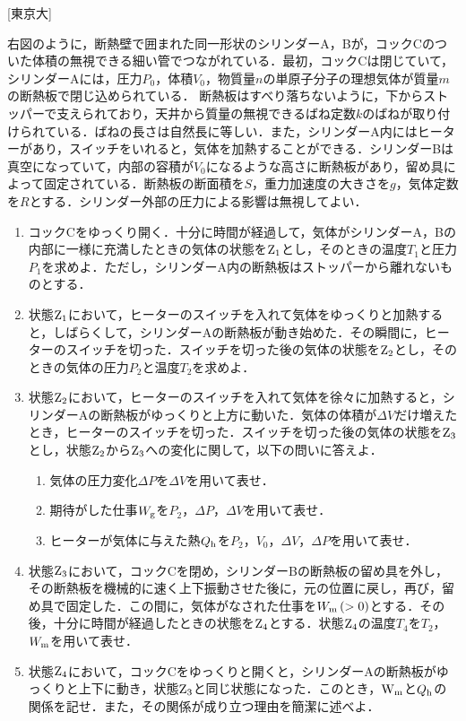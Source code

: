 

\noindent
{} [東京大]

右図のように，断熱壁で囲まれた同一形状のシリンダーA，Bが，コックCのついた体積の無視できる細い管でつながれている．最初，コックCは閉じていて，シリンダーAには，圧力$P_0$，体積$V_0$，物質量$n$の単原子分子の理想気体が質量$m$の断熱板で閉じ込められている．
断熱板はすべり落ちないように，下からストッパーで支えられており，天井から質量の無視できるばね定数$k$のばねが取り付けられている．ばねの長さは自然長に等しい．また，シリンダーA内にはヒーターがあり，スイッチをいれると，気体を加熱することができる．シリンダーBは真空になっていて，内部の容積が$V_0$になるような高さに断熱板があり，留め具によって固定されている．断熱板の断面積を$S$，重力加速度の大きさを$g$，気体定数を$R$とする．シリンダー外部の圧力による影響は無視してよい．

\begin{enumerate}[label=\textbf{問\arabic*}]
  \item {\hzw}コックCをゆっくり開く．十分に時間が経過して，気体がシリンダーA，Bの内部に一様に充満したときの気体の状態を$\mathrm{Z}_1$とし，そのときの温度$T_1$と圧力$P_1$を求めよ．ただし，シリンダーA内の断熱板はストッパーから離れないものとする．
  \item {\hzw}状態$\mathrm{Z}_1$において，ヒーターのスイッチを入れて気体をゆっくりと加熱すると，しばらくして，シリンダーAの断熱板が動き始めた．その瞬間に，ヒーターのスイッチを切った．スイッチを切った後の気体の状態を$\mathrm{Z}_2$とし，そのときの気体の圧力$P_2$と温度$T_2$を求めよ．
  \item {\hzw}状態$\mathrm{Z}_2$において，ヒーターのスイッチを入れて気体を徐々に加熱すると，シリンダーAの断熱板がゆっくりと上方に動いた．気体の体積が$\varDelta V$だけ増えたとき，ヒーターのスイッチを切った．スイッチを切った後の気体の状態を$\mathrm{Z}_3$とし，状態$\mathrm{Z}_2$から$\mathrm{Z}_3$への変化に関して，以下の問いに答えよ．
  \begin{enumerate}[(1)]
    \item {\hzw}気体の圧力変化$\varDelta P$を$\varDelta V$を用いて表せ．
    \item {\hzw}期待がした仕事$W_\mathrm{g}$を$P_2$，$\varDelta P$，$\varDelta V$を用いて表せ．
    \item {\hzw}ヒーターが気体に与えた熱$Q_\mathrm{h}$を$P_2$，$V_0$，$\varDelta V$，$\varDelta P$を用いて表せ．
  \end{enumerate}
  \item {\hzw}状態$\mathrm{Z}_3$において，コックCを閉め，シリンダーBの断熱板の留め具を外し，その断熱板を機械的に速く上下振動させた後に，元の位置に戻し，再び，留め具で固定した．この間に，気体がなされた仕事を$W_\mathrm{m} \, (> 0)$とする．その後，十分に時間が経過したときの状態を$\mathrm{Z}_4$とする．状態$\mathrm{Z}_4$の温度$T_4$を$T_2$，$W_\mathrm{m}$を用いて表せ．
  \item {\hzw}状態$\mathrm{Z}_4$において，コックCをゆっくりと開くと，シリンダーAの断熱板がゆっくりと上下に動き，状態$\mathrm{Z}_3$と同じ状態になった．このとき，$\mathrm{W}_\mathrm{m}$と$Q_\mathrm{h}$の関係を記せ．また，その関係が成り立つ理由を簡潔に述べよ．
\end{enumerate}
